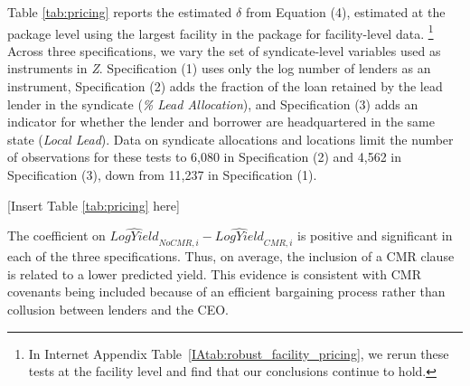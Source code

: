 \documentclass[a4paper,12pt]{article}
\begin{document}
Table \ref{tab:pricing} reports the estimated $\delta$ from Equation (4), estimated at the package level using the largest facility in the package for facility-level data.%
    \footnote{In Internet Appendix Table~\ref{IAtab:robust_facility_pricing}, we rerun these tests at the facility level and find that our conclusions continue to hold.}
Across three specifications, we vary the set of syndicate-level variables used as instruments in \textit{Z}.
Specification (1) uses only the log number of lenders as an instrument, Specification (2) adds the fraction of the loan retained by the lead lender in the syndicate (\textit{\% Lead Allocation}), and Specification (3) adds an indicator for whether the lender and borrower are headquartered in the same state (\textit{Local Lead}).
Data on syndicate allocations and locations limit the number of observations for these tests to 6,080 in Specification (2) and 4,562 in Specification (3), down from 11,237 in Specification (1).


\begin{center}
  [Insert Table \ref{tab:pricing} here]
\end{center}


The coefficient on $\widehat{LogYield}_{NoCMR,i} - \widehat{LogYield}_{CMR,i}$ is positive and significant in each of the three specifications.
Thus, on average, the inclusion of a CMR clause is related to a lower predicted yield.
This evidence is consistent with CMR covenants being included because of an efficient bargaining process rather than collusion between lenders and the CEO.
\end{document}

